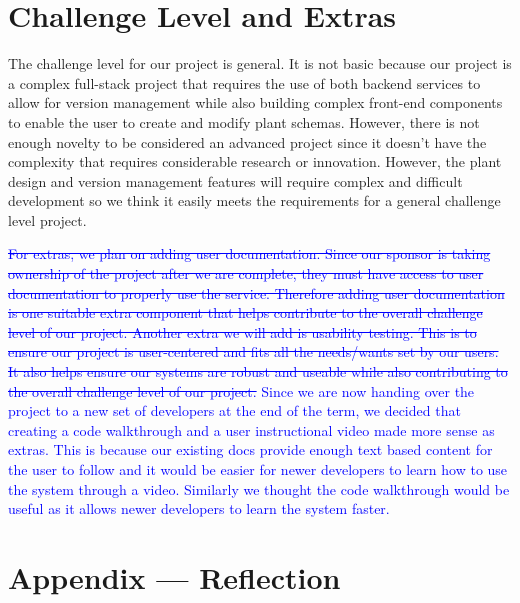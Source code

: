 \documentclass{article}
\begin{document}
\section{Challenge Level and Extras}

The challenge level for our project is general. It is not basic because our project is a complex full-stack project that requires the use of both backend services to allow for version management while also building complex front-end components to enable the user to create and modify plant schemas. However, there is not enough novelty to be considered an advanced project since it doesn't have the complexity that requires considerable research or innovation. However, the plant design and version management features will require complex and difficult development so we think it easily meets the requirements for a general challenge level project. 

\textcolor{blue}{\sout{For extras, we plan on adding user documentation. Since our sponsor is taking ownership of the project after we are complete, they must have access to user documentation to properly use the service. Therefore adding user documentation is one suitable extra component that helps contribute to the overall challenge level of our project. Another extra we will add is usability testing. This is to ensure our project is user-centered and fits all the needs/wants set by our users. It also helps ensure our systems are robust and useable while also contributing to the overall challenge level of our project.} Since we are now handing over the project to a new set of developers at the end of the term, we decided that creating a code walkthrough  and a user instructional video made more sense as extras. This is because our existing docs provide enough text based content for the user to follow and it would be easier for newer developers to learn how to use the system through a video. Similarly we thought the code walkthrough would be useful as it allows newer developers to learn the system faster.} 

\newpage{}

\section*{Appendix --- Reflection}


\end{document}
